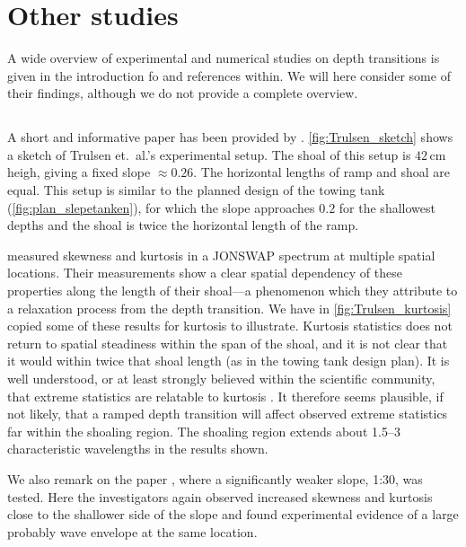\documentclass[internal]{sintefmemo}
\begin{document}
\section{Other studies}
A wide overview of experimental and numerical studies on depth transitions is given in the introduction fo \citet{li_2021_step2} and references within.
We will here consider some of their findings, although we do not provide a complete overview.


\subsection{\citet{trulsen_2020_rampKurtosis}}
A short and informative paper has been provided by \citet{trulsen_2020_rampKurtosis}.
\autoref{fig:Trulsen_sketch} shows a sketch of Trulsen et.\ al.'s experimental setup. 
The shoal of this setup is $42$\,cm heigh, giving a fixed slope $\approx 0.26$.
The horizontal lengths of ramp and shoal are equal.
This setup is similar to the planned design of the towing tank (\autoref{fig:plan_slepetanken}),
for which the slope approaches $0.2$ for the shallowest depths and the shoal is twice the horizontal length of the ramp.

\citet{trulsen_2020_rampKurtosis} measured skewness and kurtosis in a JONSWAP spectrum at multiple spatial locations.
Their measurements show a clear spatial dependency of these properties along the length of their shoal---a phenomenon which they attribute to a relaxation process from the depth transition. 
We have in \autoref{fig:Trulsen_kurtosis} copied some of these results for kurtosis to illustrate. 
Kurtosis statistics does not return to spatial steadiness within the span of the shoal, and it is not clear that it would within twice that shoal length (as in the towing tank design plan).
It is well understood, or at least strongly believed within the scientific community, that extreme statistics are relatable to kurtosis \citep[e.g.][]{mori_2006_kurtosis_and_BFI}.
It therefore seems plausible, if not likely, that a ramped depth transition will affect observed extreme statistics far within the shoaling region.
The shoaling region extends about 1.5--3 characteristic wavelengths in the results shown. 

We also remark on the paper \citet{trulsen_2012_weakSlope}, where a significantly weaker slope, 1:30, was tested. Here the investigators again observed increased skewness and kurtosis close to the shallower side of the slope and found experimental evidence of a large probably wave envelope at the same location.
\end{document}
